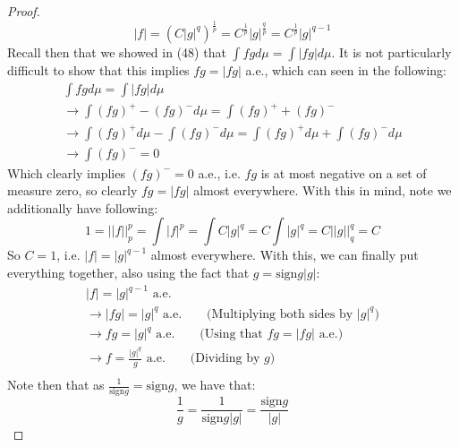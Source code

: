 \documentclass[12pt]{article}
\newenvironment{ex}[2][Exercise]{\begin{trivlist}
\item[\hskip \labelsep {\bfseries #1}\hskip \labelsep {\bfseries #2.}]}{\end{trivlist}}
\begin{document}
\begin{ex}{20}
\begin{enumerate}[label=(\alph*)]
\begin{proof}
            \begin{equation}
                |f| = (C|g|^q)^{\frac{1}{p}} = C^{\frac{1}{p}} |g|^{\frac{q}{p}} = C^{\frac{1}{p}} |g|^{q-1}
            \end{equation}
            Recall then that we showed in (48) that $\int fg d\mu =  \int |fg| d\mu$. It is not particularly difficult to show that this implies $fg = |fg|$ a.e., which can seen in the following:
            \begin{equation}
                \begin{aligned}
                    \int fg d\mu =  \int |fg| d\mu \\
                    \rightarrow \int (fg)^+ - (fg)^- d\mu = \int (fg)^+ + (fg)^- \\
                    \rightarrow \int (fg)^+ d\mu - \int (fg)^- d\mu = \int (fg)^+ d\mu + \int (fg)^- d\mu \\
                    \rightarrow \int (fg)^- = 0
                \end{aligned}
            \end{equation}
            Which clearly implies $(fg)^- = 0$ a.e., i.e. $fg$ is at most negative on a set of measure zero, so clearly $fg = |fg|$ almost everywhere. With this in mind, note we additionally have following:
            \begin{equation}
                1 = ||f||_p^p = \int |f|^p = \int C |g|^q = C\int |g|^q = C||g||_q^q = C
            \end{equation}
            So $C = 1$, i.e. $|f| = |g|^{q-1}$ almost everywhere. With this, we can finally put everything together, also using the fact that $g = \text{sign}g|g|$:
                \begin{align}
                |f| = |g|^{q-1} \text{ a.e.}\\
                \rightarrow |fg| = |g|^q \text{ a.e.} \qquad \text{(Multiplying both sides by } |g|^q) \\
                \rightarrow fg = |g|^q \text{ a.e.} \qquad \text{(Using that } fg = |fg| \text{ a.e.}) \\
                \rightarrow f = \frac{|g|^q}{g} \text{ a.e.} \qquad \text{(Dividing by } g ) \\
                \end{align}
                Note then that as $\frac{1}{\text{sign} g} = \text{sign} g$, we have that:
                \begin{equation}
                    \frac{1}{g} = \frac{1}{\text{sign}g|g|} = \frac{\text{sign}g}{|g|}

\end{equation}
\end{proof}
\end{enumerate}
\end{ex}
\end{document}
